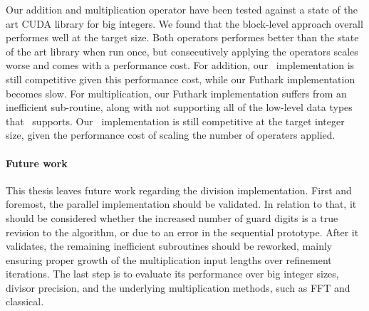 Our addition and multiplication operator have been tested against a state of the
art CUDA library for big integers. We found that the block-level approach
overall performes well at the target size. Both operators performes better than
the state of the art library when run once, but consecutively applying the
operators scales worse and comes with a performance cost. For addition, our
\cpp\ implementation is still competitive given this performance cost, while our
Futhark implementation becomes slow. For multiplication, our Futhark
implementation suffers from an inefficient sub-routine, along with not
supporting all of the low-level data types that \cpp\ supports. Our \cpp\
implementation is still competitive at the target integer size, given the
performance cost of scaling the number of operaters applied.

\paragraph{Future work}
This thesis leaves future work regarding the division implementation. First and
foremost, the parallel implementation should be validated. In relation to that,
it should be considered whether the increased number of guard digits is a true
revision to the algorithm, or due to an error in the sequential prototype. After
it validates, the remaining inefficient subroutines should be reworked, mainly
ensuring proper growth of the multiplication input lengths over refinement
iterations. The last step is to evaluate its performance over big integer sizes,
divisor precision, and the underlying multiplication methods, such as FFT and
classical.


